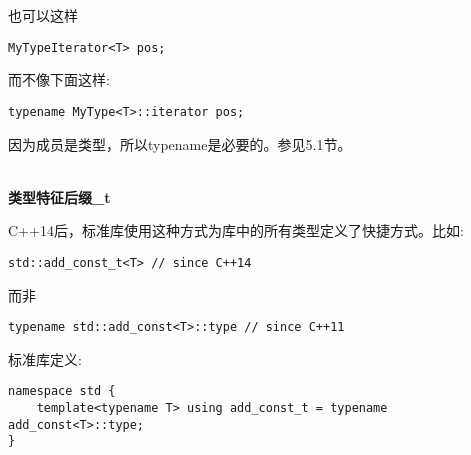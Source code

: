 也可以这样

\begin{lstlisting}[style=styleCXX]
MyTypeIterator<T> pos;
\end{lstlisting}

而不像下面这样:

\begin{lstlisting}[style=styleCXX]
typename MyType<T>::iterator pos;
\end{lstlisting}

\begin{tcolorbox}[colback=webgreen!5!white,colframe=webgreen!75!black]
\hspace*{0.75cm}因为成员是类型，所以typename是必要的。参见5.1节。
\end{tcolorbox}

\hspace*{\fill} \\ %
\noindent
\textbf{类型特征后缀\_t}

C++14后，标准库使用这种方式为库中的所有类型定义了快捷方式。比如:

\begin{lstlisting}[style=styleCXX]
std::add_const_t<T> // since C++14
\end{lstlisting}

而非

\begin{lstlisting}[style=styleCXX]
typename std::add_const<T>::type // since C++11
\end{lstlisting}

标准库定义:

\begin{lstlisting}[style=styleCXX]
namespace std {
	template<typename T> using add_const_t = typename add_const<T>::type;
}
\end{lstlisting}




